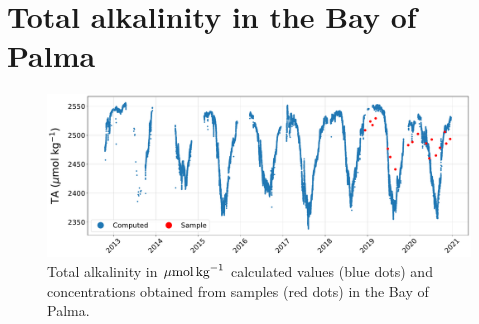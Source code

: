 \section{Total alkalinity in the Bay of Palma}

\begin{figure}[H]
    \centering
    \includegraphics[width=\textwidth]{Figures/S1.pdf}
    \caption{Total alkalinity in ${\mu \textrm{mol\,kg}^{-1}}$ calculated
        values (blue dots) and concentrations obtained from samples (red dots)
        in the
        Bay of Palma.}
    \label{fig:S1}
\end{figure}
